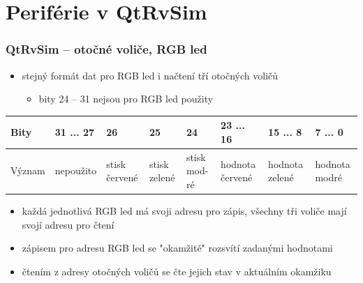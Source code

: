 \documentclass{beamer}
\begin{document}
\section{Periférie v QtRvSim}

\begin{frame}
\frametitle{QtRvSim -- otočné voliče, RGB led}

\begin{itemize}
\item stejný formát dat pro RGB led i načtení tří otočných voličů 
\begin{itemize}
\item bity 24 -- 31 nejsou pro RGB led použity
\end{itemize}
\end{itemize}

\begin{table}
\scriptsize
\begin{tabular}{|m{1.0cm}|m{1.1cm}|m{0.5cm}|m{0.5cm}|m{0.5cm}|m{1.1cm}|m{1.1cm}|m{1.1cm}|}\hline
Bity & 31 ... 27 & 26 & 25 & 24 & 23 ... 16 & 15 ... 8 & 7 ... 0 \\ \hline
Význam & nepoužito & stisk červené & stisk zelené & stisk mod- ré & hodnota červené & hodnota zelené & hodnota modré \\ \hline
\end{tabular}
\end{table}


\begin{itemize}
\item každá jednotlivá RGB led má svoji adresu pro zápis, všechny tři voliče mají svojí adresu pro čtení
\item zápisem pro adresu RGB led se "okamžitě" rozsvítí zadanými hodnotami
\item čtením z adresy otočných voličů se čte jejich stav v aktuálním okamžiku
\end{itemize}

\end{frame}
\end{document}
